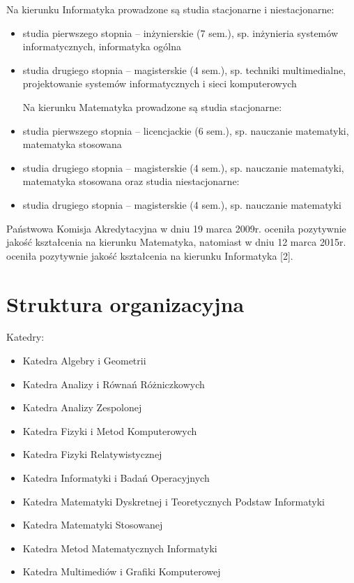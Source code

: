 \documentclass[a4paper,12pt]{article}
\begin{document}
Na kierunku Informatyka prowadzone są studia stacjonarne i niestacjonarne:

\begin{itemize}

\item studia pierwszego stopnia – inżynierskie (7 sem.), sp. inżynieria systemów informatycznych, informatyka
ogólna

\item studia drugiego stopnia – magisterskie (4 sem.), sp. techniki multimedialne, projektowanie systemów
informatycznych i sieci komputerowych

Na kierunku Matematyka prowadzone są studia stacjonarne:

\item studia pierwszego stopnia – licencjackie (6 sem.), sp. nauczanie matematyki, matematyka stosowana

\item studia drugiego stopnia – magisterskie (4 sem.), sp. nauczanie matematyki, matematyka stosowana
oraz studia niestacjonarne:

\item studia drugiego stopnia – magisterskie (4 sem.), sp. nauczanie matematyki

\end{itemize}

Państwowa Komisja Akredytacyjna w dniu 19 marca 2009r. oceniła pozytywnie jakość kształcenia na kierunku
Matematyka, natomiast w dniu 12 marca 2015r. oceniła pozytywnie jakość kształcenia na kierunku
Informatyka [2].

\section{Struktura organizacyjna}

Katedry:

 \begin{itemize}

\item Katedra Algebry i Geometrii

\item Katedra Analizy i Równań Różniczkowych

\item Katedra Analizy Zespolonej

\item Katedra Fizyki i Metod Komputerowych

\item Katedra Fizyki Relatywistycznej

\item Katedra Informatyki i Badań Operacyjnych

\item Katedra Matematyki Dyskretnej i Teoretycznych Podstaw Informatyki

\item Katedra Matematyki Stosowanej

\item Katedra Metod Matematycznych Informatyki

\item Katedra Multimediów i Grafiki Komputerowej

\end{itemize}
\end{document}

